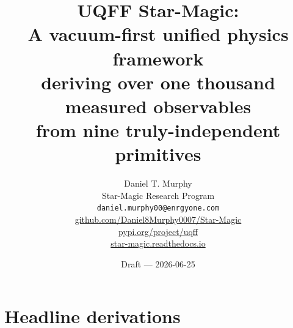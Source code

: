 \documentclass[12pt,a4paper]{article}
\title{\textbf{UQFF Star-Magic:\\
A vacuum-first unified physics framework\\
deriving over one thousand measured observables\\
from nine truly-independent primitives}}
\author{%
Daniel T. Murphy \\[3pt]
\small Star-Magic Research Program \\
\small \texttt{daniel.murphy00@enrgyone.com}\\
\small \href{https://github.com/Daniel8Murphy0007/Star-Magic}{github.com/Daniel8Murphy0007/Star-Magic} \\
\small \href{https://pypi.org/project/uqff/}{pypi.org/project/uqff} \\
\small \href{https://star-magic.readthedocs.io/}{star-magic.readthedocs.io}}
\date{Draft --- 2026-06-25}
\begin{document}
\maketitle









\section{Headline derivations}
\label{sec:headline}












% 






% 
% 




% 















\end{document}

